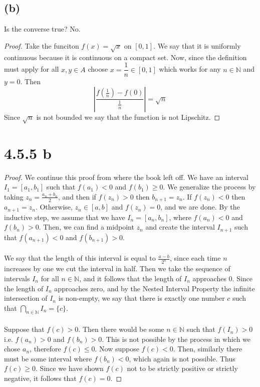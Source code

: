 \documentclass{article}
\begin{document}
\subsection*{(b)}
Is the converse true? No.
\begin{proof}
Take the funciton $f(x) = \sqrt{x}$ on $[0,1]$. We say that it is uniformly continuous because it is continuous on a compact set. Now, since the definition must apply for all $x,y \in A$ choose $x = \dfrac{1}{n} \in [0,1]$ which works for any $n \in \mathbb{N}$ and $y = 0$. Then
\[ \left| \frac{f(\frac{1}{n}) - f(0)}{\frac{1}{n}}\right| = \sqrt{n}\] 
Since $\sqrt{n}$ is not bounded we say that the function is not Lipschitz.
\end{proof}

\section*{4.5.5 b}
\begin{proof}
We continue this proof from where the book left off. We have an interval $I_1 = [a_1, b_1]$ such that $f(a_1) < 0$ and $f(b_1) \geqslant 0$. We generalize the process by taking $z_n = \frac{a_n + b_n}{2}$, and then if $f(z_n) > 0$ then $b_{n+1} = z_n$. If $f(z_n) < 0$ then $a_{n+1} = z_n$. Otherwise, $z_n \in [a,b]$ and $f(z_n) = 0$, and we are done. By the inductive step, we assume that we have $I_n = [a_n, b_n]$, where $f(a_n) < 0$ and $f(b_n) > 0$. Then, we can find a midpoint $z_n$ and create the interval $I_{n+1}$ such that $f(a_{n+1}) < 0$ and $f(b_{n+1}) > 0$. \\\\
We say that the length of this interval is equal to $\frac{a-b}{2^n}$, since each time $n$ increases by one we cut the interval in half. Then we take the sequence of intervals $I_n$ for all $n \in \mathbb{N}$, and it follows that the length of $I_n$ approaches 0. Since the length of $I_n$ approaches zero, and by the Nested Interval Property the infinite intersection of $I_n$ is non-empty, we say that there is exactly one number $c$ such that $\bigcap_{n \in \mathbb{N}}I_n = \{c\}$. \\\\
Suppose that $f(c) > 0$. Then there would be some $n \in \mathbb{N}$ such that $f(I_n) > 0$ i.e. $f(a_n) > 0$ and $f(b_n) > 0$. This is not possible by the process in which we chose $a_n$, therefore $f(c) \leqslant 0$. Now suppose $f(c) < 0$. Then, similarly there must be some interval where $f(b_n) < 0$, which again is not possible. Thus $f(c )\geqslant 0$. Since we have shown $f(c)$ not to be strictly positive or strictly negative, it follows that $f(c) = 0$.
\end{proof}
\end{document}
